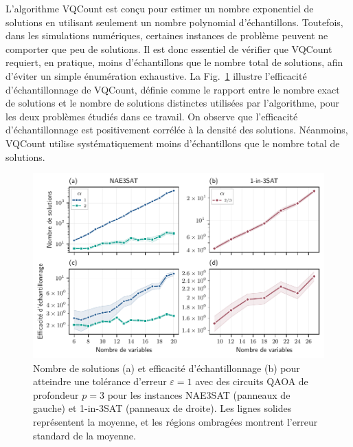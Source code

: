 L'algorithme VQCount est conçu pour estimer un nombre exponentiel de solutions en utilisant seulement un nombre polynomial d'échantillons. Toutefois, dans les simulations numériques, certaines instances de problème peuvent ne comporter que peu de solutions. Il est donc essentiel de vérifier que VQCount requiert, en pratique, moins d'échantillons que le nombre total de solutions, afin d'éviter un simple énumération exhaustive. La Fig.~\ref{fig:sampling-efficiency} illustre l'efficacité d'échantillonnage de VQCount, définie comme le rapport entre le nombre exact de solutions et le nombre de solutions distinctes utilisées par l'algorithme, pour les deux problèmes étudiés dans ce travail. On observe que l'efficacité d'échantillonnage est positivement corrélée à la densité des solutions. Néanmoins, VQCount utilise systématiquement moins d'échantillons que le nombre total de solutions.


\begin{figure}[H]
    \centering
    \includegraphics[width=1\textwidth]{figures/sampling-efficiency.pdf}
    \caption[Efficacité de l'échantillonnage pour des problèmes \#P-difficile]{Nombre de solutions (a) et efficacité d'échantillonnage (b) pour atteindre une tolérance d'erreur $\varepsilon = 1$ avec des circuits QAOA de profondeur $p=3$ pour les instances NAE3SAT (panneaux de gauche) et 1-in-3SAT (panneaux de droite). Les lignes solides représentent la moyenne, et les régions ombragées montrent l'erreur standard de la moyenne.}
    \label{fig:sampling-efficiency}
\end{figure}


